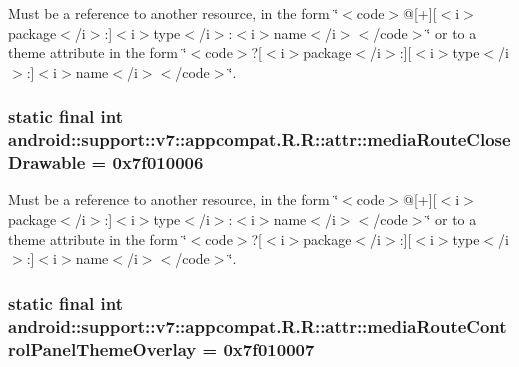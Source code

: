Must be a reference to another resource, in the form \char`\"{}$<$code$>$@\mbox{[}+\mbox{]}\mbox{[}$<$i$>$package$<$/i$>$:\mbox{]}$<$i$>$type$<$/i$>$:$<$i$>$name$<$/i$>$$<$/code$>$\char`\"{} or to a theme attribute in the form \char`\"{}$<$code$>$?\mbox{[}$<$i$>$package$<$/i$>$:\mbox{]}\mbox{[}$<$i$>$type$<$/i$>$:\mbox{]}$<$i$>$name$<$/i$>$$<$/code$>$\char`\"{}. \hypertarget{classandroid_1_1support_1_1v7_1_1appcompat_1_1_r_1_1attr_6d0137b769a57b167e5d3050a7522ad0}{
\subsubsection[{mediaRouteCloseDrawable}]{\setlength{\rightskip}{0pt plus 5cm}static final int android::support::v7::appcompat.R.R::attr::mediaRouteCloseDrawable = 0x7f010006}}
\label{classandroid_1_1support_1_1v7_1_1appcompat_1_1_r_1_1attr_6d0137b769a57b167e5d3050a7522ad0}


Must be a reference to another resource, in the form \char`\"{}$<$code$>$@\mbox{[}+\mbox{]}\mbox{[}$<$i$>$package$<$/i$>$:\mbox{]}$<$i$>$type$<$/i$>$:$<$i$>$name$<$/i$>$$<$/code$>$\char`\"{} or to a theme attribute in the form \char`\"{}$<$code$>$?\mbox{[}$<$i$>$package$<$/i$>$:\mbox{]}\mbox{[}$<$i$>$type$<$/i$>$:\mbox{]}$<$i$>$name$<$/i$>$$<$/code$>$\char`\"{}. \hypertarget{classandroid_1_1support_1_1v7_1_1appcompat_1_1_r_1_1attr_f07c303ea62ecc0789a21b3296c22bbd}{
\subsubsection[{mediaRouteControlPanelThemeOverlay}]{\setlength{\rightskip}{0pt plus 5cm}static final int android::support::v7::appcompat.R.R::attr::mediaRouteControlPanelThemeOverlay = 0x7f010007}}
\label{classandroid_1_1support_1_1v7_1_1appcompat_1_1_r_1_1attr_f07c303ea62ecc0789a21b3296c22bbd}


